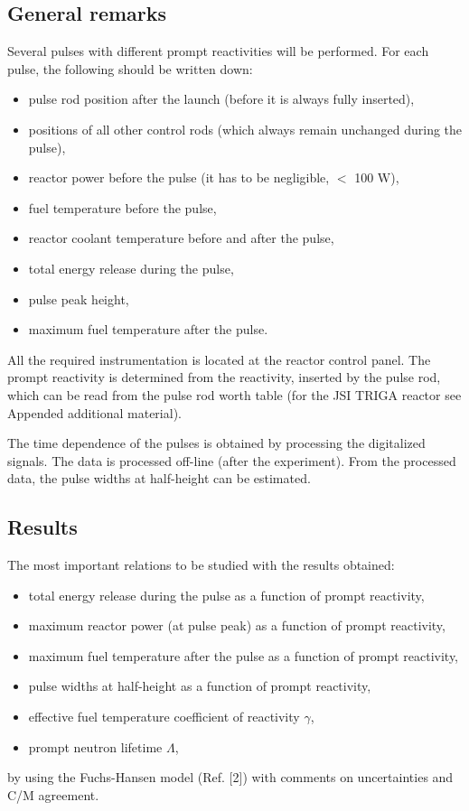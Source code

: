 \documentclass[a4paper,12pt]{article}
\begin{document}
\subsection{General remarks}
Several pulses with different prompt reactivities will be performed. For each pulse, the following should be written down:
\begin{itemize}[noitemsep]
	\item pulse rod position after the launch (before it is always fully inserted),
	\item positions of all other control rods (which always remain unchanged during the pulse),
	\item reactor power before the pulse (it has to be negligible, $<$ 100 $\mathrm{W}$),
	\item fuel temperature before the pulse,
	\item reactor coolant temperature before and after the pulse,
	\item total energy release during the pulse,
	\item pulse peak height,
	\item maximum fuel temperature after the pulse.
\end{itemize}
All the required instrumentation is located at the reactor control panel. The prompt reactivity is determined from the reactivity, inserted by the pulse rod, which can be read from the pulse rod worth table (for the JSI TRIGA reactor see Appended additional material).

The time dependence of the pulses is obtained by processing the digitalized signals. The data is processed off-line (after the experiment). From the processed data, the pulse widths at half-height can be estimated.



\subsection{Results}
The most important relations to be studied with the results obtained:
\begin{itemize}[noitemsep]
	\item total energy release during the pulse as a function of prompt reactivity,
	\item maximum reactor power (at pulse peak) as a function of prompt reactivity,
	\item maximum fuel temperature after the pulse as a function of prompt reactivity,
	\item pulse widths at half-height as a function of prompt reactivity,
	\item effective fuel temperature coefficient of reactivity $\gamma$,
	\item prompt neutron lifetime $\Lambda$,
\end{itemize}
by using the Fuchs-Hansen model (Ref. [2]) with comments on uncertainties and C/M agreement.
\end{document}
